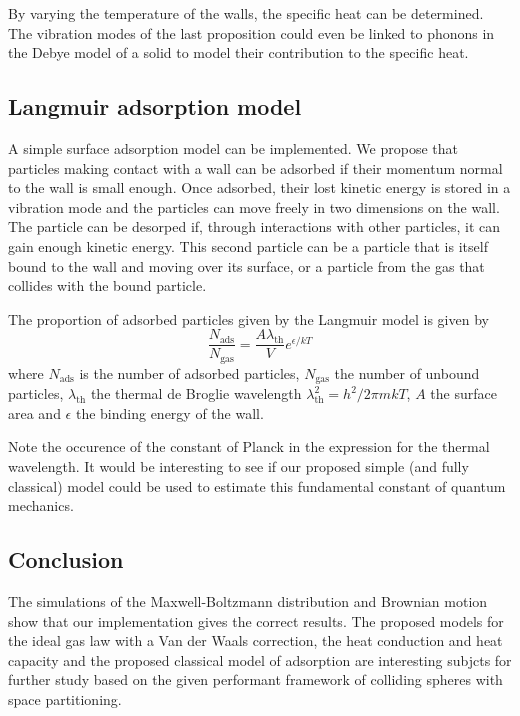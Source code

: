 By varying the temperature of the walls, the specific heat can be 
determined. The vibration modes of the last proposition could even be 
linked to phonons in the Debye model of a solid to model their contribution 
to the specific heat.


\subsection{Langmuir adsorption model}

A simple surface adsorption model can be implemented. We propose that particles 
making contact with a wall can be adsorbed if their momentum normal to the wall 
is small enough. Once adsorbed, their lost kinetic energy is stored in a 
vibration mode and the particles can move freely in two dimensions on the wall.  
The particle can be desorped if, through interactions with other particles, it 
can gain enough kinetic energy. This second particle can be a particle that is 
itself bound to the wall and moving over its surface, or a particle from the 
gas that collides with the bound particle.

The proportion of adsorbed particles given by the Langmuir model is given 
by\cite{adsorptionModel}
$$
\frac{N_\mathrm{ads}}{N_\mathrm{gas}} =
\frac{A \lambda_\mathrm{th}}{V}e^{\epsilon/kT}
$$
where $N_\mathrm{ads}$ is the number of adsorbed particles, $N_\mathrm{gas} $ 
the number of unbound particles, $\lambda_{\mathrm{th}}$ the thermal de Broglie 
wavelength $\lambda_{\mathrm{th}}^2 = h^2 / 2 \pi m k T$, $A$ the surface area 
and $\epsilon$ the binding energy of the wall.

Note the occurence of the constant of Planck in the expression for the 
thermal wavelength. It would be interesting to see if our proposed simple 
(and fully classical) model could be used to estimate this fundamental 
constant of quantum mechanics.


\subsection{Conclusion}
The simulations of the Maxwell-Boltzmann distribution and Brownian motion 
show that our implementation gives the correct results. The proposed models
for the ideal gas law with a Van der Waals correction, the heat conduction 
and heat capacity and the proposed classical model of adsorption are 
interesting subjcts for further study based on the given performant 
framework of colliding spheres with space partitioning.


